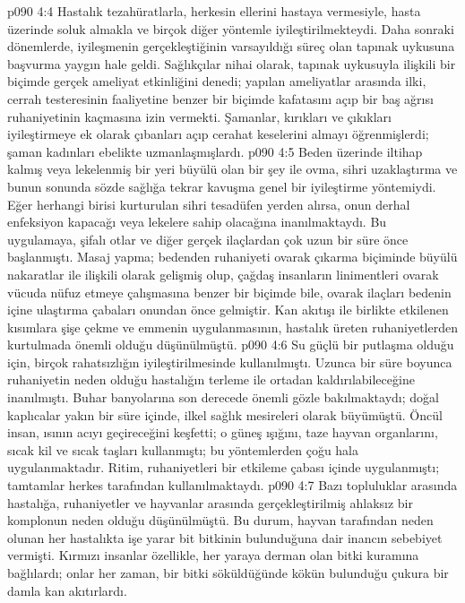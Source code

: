 \vs p090 4:4 Hastalık tezahüratlarla, herkesin ellerini hastaya vermesiyle, hasta üzerinde soluk almakla ve birçok diğer yöntemle iyileştirilmekteydi. Daha sonraki dönemlerde, iyileşmenin gerçekleştiğinin varsayıldığı süreç olan tapınak uykusuna başvurma yaygın hale geldi. Sağlıkçılar nihai olarak, tapınak uykusuyla ilişkili bir biçimde gerçek ameliyat etkinliğini denedi; yapılan ameliyatlar arasında ilki, cerrah testeresinin faaliyetine benzer bir biçimde kafatasını açıp bir baş ağrısı ruhaniyetinin kaçmasına izin vermekti. Şamanlar, kırıkları ve çıkıkları iyileştirmeye ek olarak çıbanları açıp cerahat keselerini almayı öğrenmişlerdi; şaman kadınları ebelikte uzmanlaşmışlardı.
\vs p090 4:5 Beden üzerinde iltihap kalmış veya lekelenmiş bir yeri büyülü olan bir şey ile ovma, sihri uzaklaştırma ve bunun sonunda sözde sağlığa tekrar kavuşma genel bir iyileştirme yöntemiydi. Eğer herhangi birisi kurturulan sihri tesadüfen yerden alırsa, onun derhal enfeksiyon kapacağı veya lekelere sahip olacağına inanılmaktaydı. Bu uygulamaya, şifalı otlar ve diğer gerçek ilaçlardan çok uzun bir süre önce başlanmıştı. Masaj yapma; bedenden ruhaniyeti ovarak çıkarma biçiminde büyülü nakaratlar ile ilişkili olarak gelişmiş olup, çağdaş insanların linimentleri ovarak vücuda nüfuz etmeye çalışmasına benzer bir biçimde bile, ovarak ilaçları bedenin içine ulaştırma çabaları onundan önce gelmiştir. Kan akıtışı ile birlikte etkilenen kısımlara şişe çekme ve emmenin uygulanmasının, hastalık üreten ruhaniyetlerden kurtulmada önemli olduğu düşünülmüştü.
\vs p090 4:6 Su güçlü bir putlaşma olduğu için, birçok rahatsızlığın iyileştirilmesinde kullanılmıştı. Uzunca bir süre boyunca ruhaniyetin neden olduğu hastalığın terleme ile ortadan kaldırılabileceğine inanılmıştı. Buhar banyolarına son derecede önemli gözle bakılmaktaydı; doğal kaplıcalar yakın bir süre içinde, ilkel sağlık mesireleri olarak büyümüştü. Öncül insan, ısının acıyı geçireceğini keşfetti; o güneş ışığını, taze hayvan organlarını, sıcak kil ve sıcak taşları kullanmıştı; bu yöntemlerden çoğu hala uygulanmaktadır. Ritim, ruhaniyetleri bir etkileme çabası içinde uygulanmıştı; tamtamlar herkes tarafından kullanılmaktaydı.
\vs p090 4:7 Bazı topluluklar arasında hastalığa, ruhaniyetler ve hayvanlar arasında gerçekleştirilmiş ahlaksız bir komplonun neden olduğu düşünülmüştü. Bu durum, hayvan tarafından neden olunan her hastalıkta işe yarar bit bitkinin bulunduğuna dair inancın sebebiyet vermişti. Kırmızı insanlar özellikle, her yaraya derman olan bitki kuramına bağlılardı; onlar her zaman, bir bitki söküldüğünde kökün bulunduğu çukura bir damla kan akıtırlardı.
